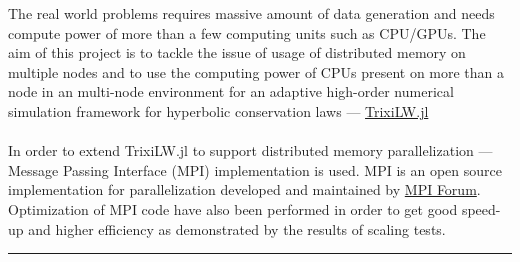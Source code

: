 
The real world problems requires massive amount of data generation and needs compute power of more than a few computing units such as CPU/GPUs. The aim of this project is to tackle the issue of usage of distributed memory on multiple nodes and to use the computing power of CPUs present on more than a node in an multi-node environment for an adaptive high-order numerical simulation framework for hyperbolic conservation laws --- \href{https://www.example.com}{\ttfamily TrixiLW.jl}\\ \\ 
In order to extend {\ttfamily TrixiLW.jl} to support distributed memory parallelization --- Message Passing Interface (MPI) implementation is used. MPI is an open source implementation for parallelization developed and maintained by \href{https://www.mpi-forum.org/}{MPI Forum}. Optimization of MPI code have also been performed in order to get good speed-up and higher efficiency as demonstrated by the results of scaling tests.

\begin{center}
    \rule{3cm}{1pt}
\end{center}